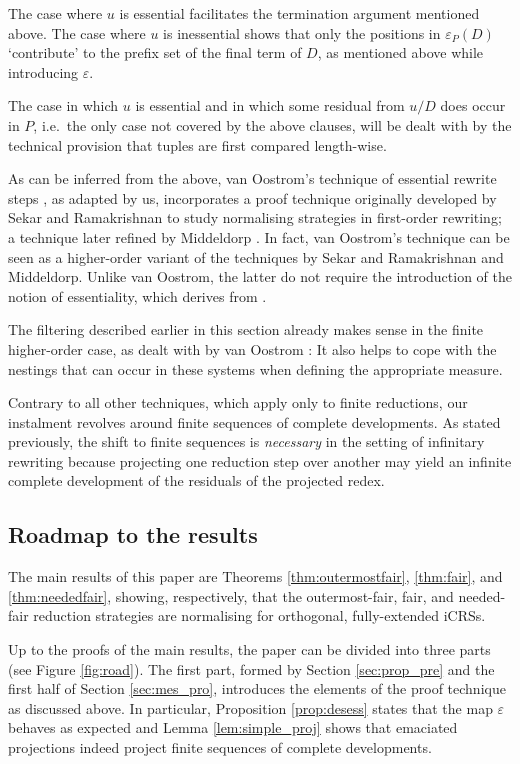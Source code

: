 \documentclass{LMCS}
\theoremstyle{definition}
\newcommand{\pmap}{\varepsilon}
\newcommand{\pmapp}[2]{\pmap_{#1}({#2})}
\begin{document}
The case where $u$ is essential facilitates the termination argument mentioned  above. The case where $u$ is inessential shows that only the positions in $\pmapp{P}{D}$ `contribute' to the prefix set of the final term of $D$, as mentioned above while introducing $\pmap$.

The case in which $u$ is essential and in which some residual from $u/D$ does occur in $P$, i.e.\ the only case not covered by the above clauses, will be dealt with by the technical provision that tuples are first compared length-wise.

\begin{rem}
As can be inferred from the above, van Oostrom's technique of essential rewrite steps \cite{O99}, as adapted by us, incorporates a proof technique originally developed by Sekar and Ramakrishnan \cite{SR90} to study normalising strategies in first-order rewriting; a technique later refined by Middeldorp \cite{M97}. In fact, van Oostrom's technique can be seen as a higher-order variant of the techniques by Sekar and Ramakrishnan and Middeldorp. Unlike van Oostrom, the latter do not require the introduction of the notion of essentiality, which derives from \cite{K88,GK94}.

The filtering described earlier in this section already makes sense in the finite higher-order case, as dealt with by van Oostrom \cite{O99}: It also helps to cope with the nestings that can occur in these systems when defining the appropriate measure.

Contrary to all other techniques, which apply only to finite reductions, our instalment revolves around finite sequences of complete developments. As stated previously, the shift to finite sequences is \emph{necessary} in the setting of infinitary rewriting because projecting one reduction step over another may yield an infinite complete development of the residuals of the projected redex.
\end{rem}

\subsection{Roadmap to the results}

The main results of this paper are Theorems \ref{thm:outermostfair}, \ref{thm:fair}, and \ref{thm:neededfair}, showing, respectively, that the outermost-fair, fair, and needed-fair reduction strategies are normalising for orthogonal, fully-extended iCRSs.

Up to the proofs of the main results, the paper can be divided into three parts (see Figure \ref{fig:road}). The first part, formed by Section \ref{sec:prop_pre} and the first half of Section \ref{sec:mes_pro}, introduces the elements of the proof technique as discussed above. In particular, Proposition \ref{prop:desess} states that the map $\pmap$ behaves as expected and Lemma \ref{lem:simple_proj} shows that emaciated projections indeed project finite sequences of complete developments.
\end{document}
